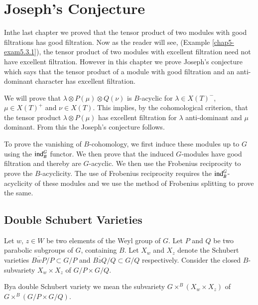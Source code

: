 \chapter{Joseph's Conjecture}\label{chap5}

In\pageoriginale the\label{page48} last chapter we proved that the tensor product of
two modules with good filtrations has good filtration. Now as the
reader will see, (Example \ref{chap5-exam5.3.1}), the tensor product
of two modules with excellent filtration need not have excellent
filtration. However in this chapter we prove Joseph's conjecture which
says that the tensor product of a module with good filtration and an
anti-dominant character has excellent filtration.

We will prove that $\lambda\otimes P(\mu)\otimes Q(\nu)$ is
$B$-acyclic for $\lambda\in X(T)^{-}$, $\mu\in X(T)^{+}$ and $\nu\in
X(T)$. This implies, by the cohomological criterion, that the tensor
product $\lambda\otimes P(\mu)$ has excellent filtration for $\lambda$
anti-dominant and $\mu$ dominant. From this the Joseph's conjecture
follows.

To prove the vanishing of $B$-cohomology, we first induce these
modules up to $G$ using the $\operatorname{ind}^{G}_{B}$ functor. We then prove that
the induced $G$-modules have good filtration and thereby are
$G$-acyclic. We then use the Frobenius reciprocity to prove the
$B$-acyclicity. The use of Frobenius reciprocity requires the
$\operatorname{ind}^{G}_{B}$-acyclicity of these modules and we use the method of
Frobenius splitting to prove the same.

\section{Double Schubert Varieties}\label{chap5-sec5.1}

Let $w$, $z\in W$ be two elements of the Weyl group of $G$. Let $P$
and $Q$ be two parabolic subgroups of $G$, containing $B$. Let $X_{w}$
and $X_{z}$ denote the Schubert varieties $\overline{BwP}/P\subset
G/P$ and $\overline{BzQ}/Q\subset G/Q$ respectively. Consider the
closed $B$-subvariety $X_{w}\times X_{z}$ of $G/P\times G/Q$.

\begin{definition}\label{chap5-defi5.1.1}
By\pageoriginale a double\label{page49} Schubert variety we mean the subvariety
$G\times^{B}(X_{w}\times X_{z})$ of $G\times^{B}(G/P\times G/Q)$.
\end{definition}

